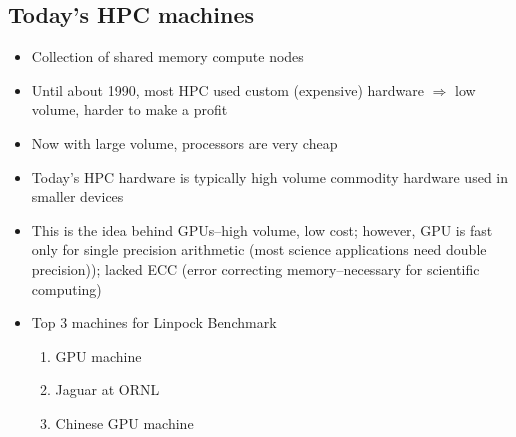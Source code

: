 \documentclass[10pt]{article}
\newenvironment{mitemize}
{
  \begin{itemize}
  \setlength{\itemsep}{1pt}
  \setlength{\parskip}{0pt}
  \setlength{\parsep}{0pt}}{\end{itemize}
}
\newenvironment{menumerate}
{
  \begin{enumerate}
  \setlength{\itemsep}{1pt}
  \setlength{\parskip}{0pt}
  \setlength{\parsep}{0pt}}{\end{enumerate}
}
\begin{document}
  \subsection{Today's HPC machines}
  \begin{mitemize}
    \item Collection of shared memory compute nodes
    \item Until about 1990, most HPC used custom (expensive) hardware $ \Rightarrow $ low volume, harder to make a profit
    \item Now with large volume, processors are very cheap
    \item Today's HPC hardware is typically high volume commodity hardware used in smaller devices
    \item This is the idea behind GPUs--high volume, low cost; however, GPU is fast only for single precision arithmetic (most science applications need double precision)); lacked ECC (error correcting memory--necessary for scientific computing)
    \item Top 3 machines for Linpock Benchmark
    \begin{menumerate}
      \item GPU machine
      \item Jaguar at ORNL
      \item Chinese GPU machine
    \end{menumerate}
  \end{mitemize}
  
\end{document}
